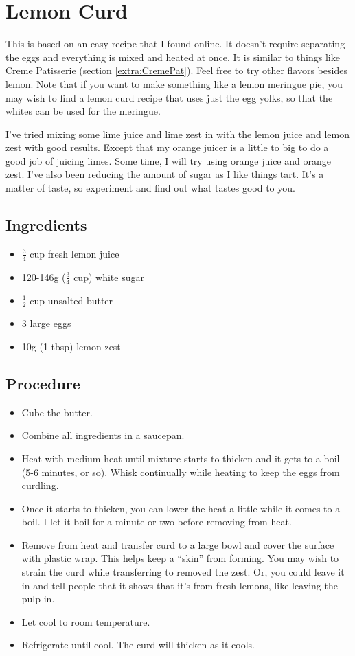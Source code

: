 \documentclass[10pt, openany]{book}
\begin{document}
\section{Lemon Curd}
This is based on an easy recipe that I found online.  It doesn't require separating the eggs and everything is mixed and heated at once.  It is similar to things like Creme Patisserie (section \ref{extra:CremePat}).  Feel free to try other flavors besides lemon.  Note that if you want to make something like a lemon meringue pie, you may wish to find a lemon curd recipe that uses just the egg yolks, so that the whites can be used for the meringue.

I've tried mixing some lime juice and lime zest in with the lemon juice and lemon zest with good results.  Except that my orange juicer is a little to big to do a good job of juicing limes.  Some time, I will try using orange juice and orange zest. I've also been reducing the amount of sugar as I like things tart.  It's a matter of taste, so experiment and find out what tastes good to you.

\subsection{Ingredients}
\begin{itemize}
  \item $\frac{3}{4}$ cup fresh lemon juice
  \item 120-146g ($\frac{3}{4}$ cup) white sugar
  \item $\frac{1}{2}$ cup unsalted butter
  \item 3 large eggs
  \item 10g (1 tbsp) lemon zest
\end{itemize}

\subsection{Procedure}
\begin{itemize}
  \item Cube the butter.
  \item Combine all ingredients in a saucepan.
  \item Heat with medium heat until mixture starts to thicken and it gets to a boil (5-6 minutes, or so).  Whisk continually while heating to keep the eggs from curdling.
  \item Once it starts to thicken, you can lower the heat a little while it comes to a boil.  I let it boil for a minute or two before removing from heat.
  \item Remove from heat and transfer curd to a large bowl and cover the surface with plastic wrap.  This helps keep a ``skin'' from forming.  You may wish to strain the curd while transferring to removed the zest.  Or, you could leave it in and tell people that it shows that it's from fresh lemons, like leaving the pulp in.
  \item Let cool to room temperature.
  \item Refrigerate until cool.  The curd will thicken as it cools.
\end{itemize}
\end{document}

